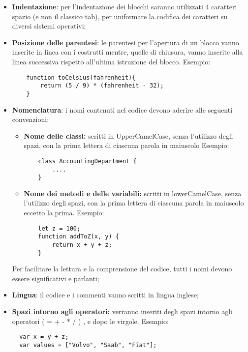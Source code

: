 \begin{itemize}
  \item \textbf{Indentazione}: per l'indentazione dei blocchi saranno utilizzati 4 caratteri spazio (e non il classico tab), per uniformare la codifica dei caratteri su diversi sistemi operativi;
  \item \textbf{Posizione delle parentesi}: le parentesi per l'apertura di un blocco vanno inserite in linea con i costrutti mentre, quelle di chiusura, vanno inserite alla linea successiva rispetto all'ultima istruzione del blocco.
  Esempio:
  \begin{lstlisting}
  	function toCelsius(fahrenheit){
  		return (5 / 9) * (fahrenheit - 32);
  	}
  \end{lstlisting}
  \item \textbf{Nomenclatura}: i nomi contenuti nel codice devono aderire alle seguenti convenzioni:
  \begin{itemize}
  	\item \textbf{Nome delle classi:} scritti in UpperCamelCase, senza l'utilizzo degli spazi, con la prima lettera di ciascuna parola in maiuscolo Esempio:
  	\begin{lstlisting}
  	class AccountingDepartment {
  		....
  	}
  	\end{lstlisting}
  	\item \textbf{Nome dei metodi e delle variabili:} scritti in lowerCamelCase, senza l'utilizzo degli spazi, con la prima lettera di ciascuna parola in maiuscolo eccetto la prima. Esempio:
  	\begin{lstlisting}
  	let z = 100;
  	function addToZ(x, y) {
  		return x + y + z;
  	}
  	\end{lstlisting}
  \end{itemize}
  Per facilitare la lettura e la comprensione del codice, tutti i nomi devono essere significativi e parlanti;
  \item \textbf{Lingua}: il codice e i commenti vanno scritti in lingua inglese;
  \item \textbf{Spazi intorno agli operatori:} verranno inseriti degli spazi intorno agli operatori ( = + - * / ) , e dopo le virgole. 
  Esempio:
  \begin{lstlisting}
  var x = y + z;
  var values = ["Volvo", "Saab", "Fiat"];
  \end{lstlisting}
  
\end{itemize}
